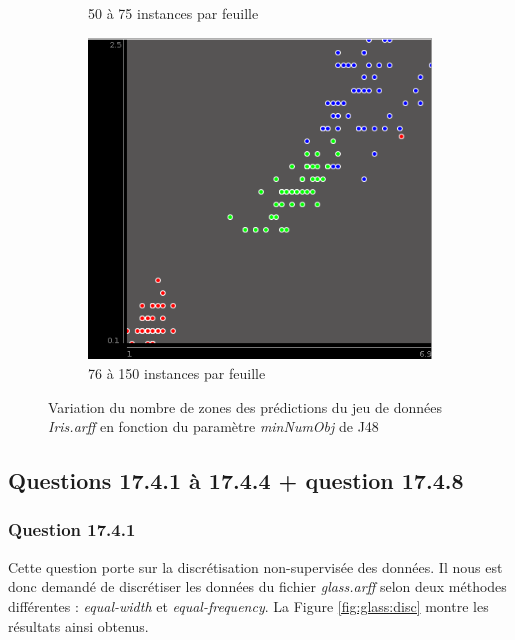\documentclass[11pt,a4paper]{article}
\begin{document}
\begin{figure}[h]
\begin{subfigure}{.333\textwidth}
		   			\caption{50 à 75 instances par feuille}
		   		\end{subfigure}%
		   		\begin{subfigure}{.333\textwidth}
		   			\centering
		   			\includegraphics[width=.9\textwidth]{iris_J48_1zone}
		   			\caption{76 à 150 instances par feuille}
		   		\end{subfigure}
		   		
		   		\caption{Variation du nombre de zones des prédictions du jeu de données \textit{Iris.arff} en fonction du paramètre \textit{minNumObj} de J48}
		   		\label{fig:iris:J48:zones}
		   	\end{figure}
		   	
		\subsection{Questions 17.4.1 à 17.4.4 + question 17.4.8}
		
			\subsubsection*{Question 17.4.1}
			
			Cette question porte sur la discrétisation non-supervisée des données. Il nous est donc demandé de discrétiser les données du fichier \textit{glass.arff} selon deux méthodes différentes : \textit{equal-width} et \textit{equal-frequency}. La Figure \ref{fig:glass:disc} montre les résultats ainsi obtenus.\\
			
\end{document}
